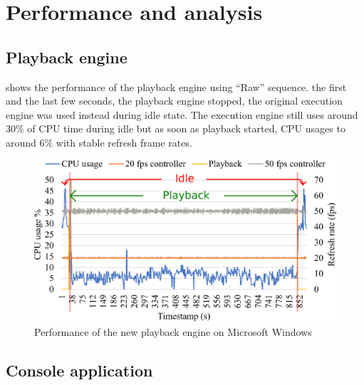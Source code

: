 \chapter{Performance and analysis}
\renewcommand{\baselinestretch}{\mystretch}
\label{chap:Perf}

 

\section{Playback engine}

 shows the performance of the  playback engine  using  ``Raw'' sequence.  the first and the last few seconds, the playback engine stopped,  the original execution engine was used instead during idle state. The execution engine still uses around $30 \%$ of CPU time during idle\cc{,} but as soon as playback started, CPU usages  to around $6 \%$ with stable refresh frame rates. 

\begin{figure}[t]
  \centering
  \includegraphics[width=0.8\columnwidth]{Figs/playback.eps}
  \caption{\footnotesize Performance of the new playback engine on Microsoft Windows}
  \label{fig:playback}
\end{figure}

\section{Console application}

